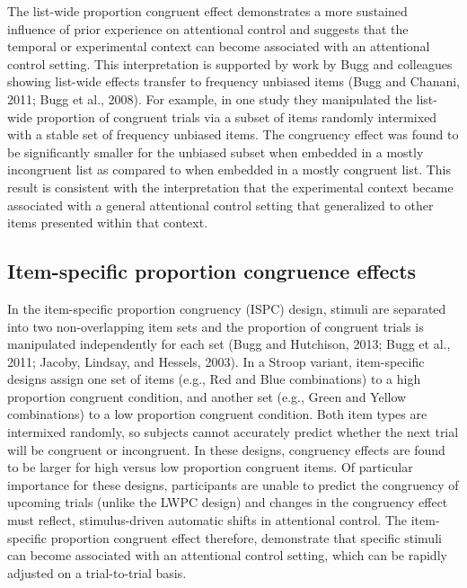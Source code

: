 \documentclass[]{DissertateCUNY}
\begin{document}
The list-wide proportion congruent effect demonstrates a more sustained
influence of prior experience on attentional control and suggests that
the temporal or experimental context can become associated with an
attentional control setting. This interpretation is supported by work by
Bugg and colleagues showing list-wide effects transfer to frequency
unbiased items (Bugg and Chanani, 2011; Bugg et al., 2008). For example,
in one study they manipulated the list-wide proportion of congruent
trials via a subset of items randomly intermixed with a stable set of
frequency unbiased items. The congruency effect was found to be
significantly smaller for the unbiased subset when embedded in a mostly
incongruent list as compared to when embedded in a mostly congruent
list. This result is consistent with the interpretation that the
experimental context became associated with a general attentional
control setting that generalized to other items presented within that
context.

\hypertarget{item-specific-proportion-congruence-effects}{%
\subsection{Item-specific proportion congruence
effects}\label{item-specific-proportion-congruence-effects}}

In the item-specific proportion congruency (ISPC) design, stimuli are
separated into two non-overlapping item sets and the proportion of
congruent trials is manipulated independently for each set (Bugg and
Hutchison, 2013; Bugg et al., 2011; Jacoby, Lindsay, and Hessels, 2003).
In a Stroop variant, item-specific designs assign one set of items
(e.g., Red and Blue combinations) to a high proportion congruent
condition, and another set (e.g., Green and Yellow combinations) to a
low proportion congruent condition. Both item types are intermixed
randomly, so subjects cannot accurately predict whether the next trial
will be congruent or incongruent. In these designs, congruency effects
are found to be larger for high versus low proportion congruent items.
Of particular importance for these designs, participants are unable to
predict the congruency of upcoming trials (unlike the LWPC design) and
changes in the congruency effect must reflect, stimulus-driven automatic
shifts in attentional control. The item-specific proportion congruent
effect therefore, demonstrate that specific stimuli can become
associated with an attentional control setting, which can be rapidly
adjusted on a trial-to-trial basis.
\end{document}
